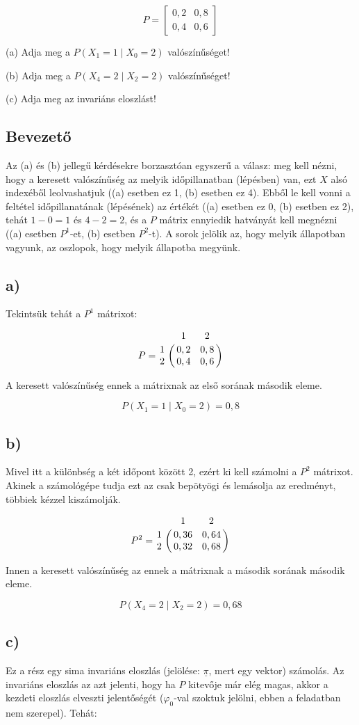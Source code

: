 \documentclass[a4paper,12pt]{article}
\begin{document}
\[
P = 
\begin{bmatrix} 
0,2    &    0,8 \\
0,4    &    0,6
\end{bmatrix}
\]

(a) Adja meg a $P(X_1 = 1 \mid X_0 = 2)$ valószínűséget!

(b) Adja meg a $P(X_4 = 2 \mid X_2 = 2)$ valószínűséget!

(c) Adja meg az invariáns eloszlást!

\subsection*{Bevezető}
Az (a) és (b) jellegű kérdésekre borzasztóan egyszerű a válasz:
meg kell nézni, hogy a keresett valószínűség az  melyik időpillanatban 
(lépésben) van, ezt $X$ alsó indexéből leolvashatjuk ((a) esetben ez 1,
(b) esetben ez 4). 
Ebből le kell vonni a feltétel időpillanatának (lépésének) az értékét 
((a) esetben ez 0, (b) esetben ez 2), tehát $1-0=1$ és $4-2=2$, és a 
$P$ mátrix ennyiedik hatványát kell megnézni
((a) esetben $P^1$-et, (b) esetben $P^2$-t). A sorok jelölik az, hogy 
melyik állapotban vagyunk, az oszlopok, hogy melyik állapotba megyünk.

\subsection*{a)}
Tekintsük tehát a $P^1$ mátrixot:

\[
P = 
\bordermatrix{
~	&	1	&	2	\cr
1	&	0,2	&	0,8	\cr
2	&	0,4	&	0,6}
\]

A keresett valószínűség ennek a mátrixnak az első sorának második eleme.

\[
P(X_1 = 1 \mid X_0 = 2) = 0,8
\]

\subsection*{b)}
Mivel itt a különbség a két időpont között 2, ezért ki kell számolni a 
$P^2$ mátrixot. Akinek a számológépe tudja ezt az csak bepötyögi és 
lemásolja az eredményt,  többiek kézzel kiszámolják.

\[
P^2 = 
\bordermatrix{
~	&	1	    &	2    	\cr
1	&	0,36	&	0,64	\cr
2	&	0,32	&	0,68}
\]

Innen a keresett valószínűség az ennek a mátrixnak a második sorának
második eleme.

\[
P(X_4 = 2 \mid X_2 = 2) = 0,68
\]

\subsection*{c)}
Ez a rész egy sima invariáns eloszlás (jelölése: $\underline{\pi}$, 
mert egy vektor) számolás. Az invariáns eloszlás 
az azt jelenti, hogy ha $P$ kitevője már elég magas, akkor a kezdeti
eloszlás elveszti jelentőségét ($\varphi_0$-val szoktuk jelölni, ebben a
feladatban nem szerepel). Tehát:
\end{document}
